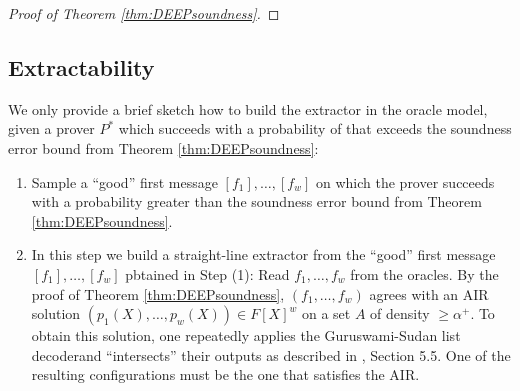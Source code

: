\documentclass[11pt,article,oneside]{memoir}
\theoremstyle{definition}
\theoremstyle{remark}
\begin{document}
\begin{proof}[Proof of Theorem \ref{thm:DEEPsoundness}]
\end{proof}


\subsection{Extractability}

We only provide a brief sketch how to build the extractor in the oracle model, given a prover $P^*$ which succeeds with a probability of that exceeds the soundness error bound from Theorem \ref{thm:DEEPsoundness}:
\begin{enumerate}
\item
Sample a “good” first message $[f_1],\ldots , [f_w]$ on which the prover succeeds with a probability greater than the soundness error bound from Theorem \ref{thm:DEEPsoundness}.

\item
In this step we build a straight-line extractor from the “good” first message $[f_1],\ldots , [f_w]$ pbtained in Step (1):
Read $f_1, \ldots ,f_w$ from the oracles. 
By the proof of Theorem \ref{thm:DEEPsoundness}, $(f_1,\ldots ,f_w)$ agrees with an AIR solution $(p_1(X),\ldots ,p_w(X))\in F[X]^w$ on a set $A$ of density $\geq \alpha^+$. 
To obtain this solution, one repeatedly applies the Guruswami-Sudan list decoder\footnotemark and   “intersects” their outputs as described in \cite{ethSTARK}, Section 5.5.
One of the resulting configurations must be the one that satisfies the AIR.
%
\end{enumerate}
\end{document}
